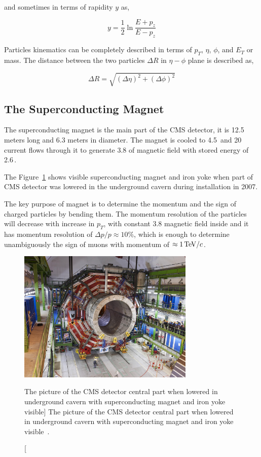 and sometimes in terms of rapidity \( y \) as,

\begin{equation}
  y = \frac{1}{2} \ln{\frac{E+p_{z}}{E-p_{z}}}
\end{equation}

Particles kinematics can be completely described in terms of
\( p_{T} \), \( \eta \), \( \phi \), and \( E_{T} \) or mass.
The distance between the two particles \( \Delta R \) in \( \eta - \phi \) plane
is described as,

\begin{equation}
  \Delta R = \sqrt{ {(\Delta \eta)}^{2} + {(\Delta \phi)}^{2} }
\end{equation}

\subsection{
  The Superconducting Magnet
}

The superconducting magnet is the main part of the \gls{CMS} detector, it is
12.5 meters long and 6.3 meters in diameter. The magnet is cooled to
4.5\,\xspace and 20\,\xspace current flows through it to
generate 3.8\Tesla{} of magnetic field with stored energy of 2.6\,\xspace.

The Figure~\ref{fig:cms-magnet} shows visible superconducting magnet
and iron yoke when part of \gls{CMS} detector was lowered in the underground
cavern during installation in 2007.

The key purpose of magnet is to determine the momentum and the sign of charged
particles by bending them. The momentum resolution of the particles will
decrease with increase in \(p_T \), with constant 3.8\Tesla{} magnetic field
inside and it has momentum resolution of \(\Delta p /p \approx 10 \% \), which
is enough to determine unambiguously the sign of muons with
momentum of \(\approx 1\,\text{Te\hspace{-.08em}V}{}/c \).

\begin{figure}[!ht]
  \centering
  \includegraphics[width=0.75\textwidth]{figures/cms_magnet_lowered.jpg}
  \caption%
  [The picture of the CMS detector central part when lowered in underground
    cavern with superconducting magnet and iron
    yoke visible]%
  {The picture of the CMS detector central part when lowered in underground
    cavern with superconducting magnet and iron
    yoke visible~\cite{image-cms-magnet}.}%
  \label{fig:cms-magnet}
\end{figure}


